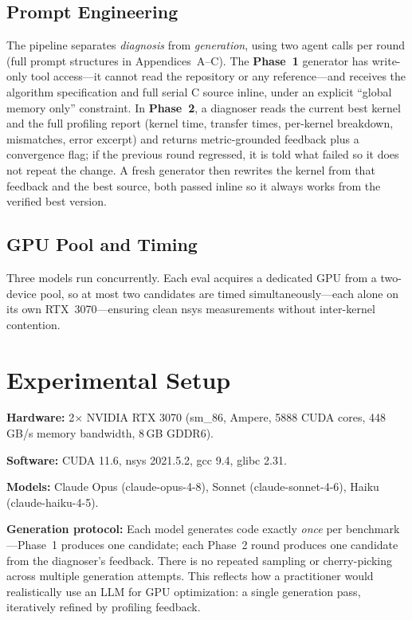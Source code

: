 \documentclass[conference]{IEEEtran}
\begin{document}
\subsection{Prompt Engineering}

The pipeline separates \emph{diagnosis} from \emph{generation}, using two agent
calls per round (full prompt structures in Appendices~A--C). The \textbf{Phase~1}
generator has write-only tool access---it cannot read the repository or any
reference---and receives the algorithm specification and full serial C source
inline, under an explicit ``global memory only'' constraint. In \textbf{Phase~2},
a diagnoser reads the current best kernel and the full profiling report (kernel
time, transfer times, per-kernel breakdown, mismatches, error excerpt) and
returns metric-grounded feedback plus a convergence flag; if the previous round
regressed, it is told what failed so it does not repeat the change. A fresh
generator then rewrites the kernel from that feedback and the best source, both
passed inline so it always works from the verified best version.

\subsection{GPU Pool and Timing}

Three models run concurrently. Each eval acquires a dedicated GPU from a
two-device pool, so at most two candidates are timed simultaneously---each
alone on its own RTX~3070---ensuring clean nsys measurements without
inter-kernel contention.

\section{Experimental Setup}

\textbf{Hardware:} 2$\times$ NVIDIA RTX 3070 (sm\_86, Ampere, 5888 CUDA cores,
448\,GB/s memory bandwidth, 8\,GB GDDR6).

\textbf{Software:} CUDA 11.6, nsys 2021.5.2, gcc 9.4, glibc 2.31.

\textbf{Models:} Claude Opus (claude-opus-4-8), Sonnet (claude-sonnet-4-6),
Haiku (claude-haiku-4-5).

\textbf{Generation protocol:} Each model generates code exactly \emph{once}
per benchmark---Phase~1 produces one candidate; each Phase~2 round produces
one candidate from the diagnoser's feedback. There is no repeated sampling or
cherry-picking across multiple generation attempts. This reflects how a
practitioner would realistically use an LLM for GPU optimization: a single
generation pass, iteratively refined by profiling feedback.
\end{document}
